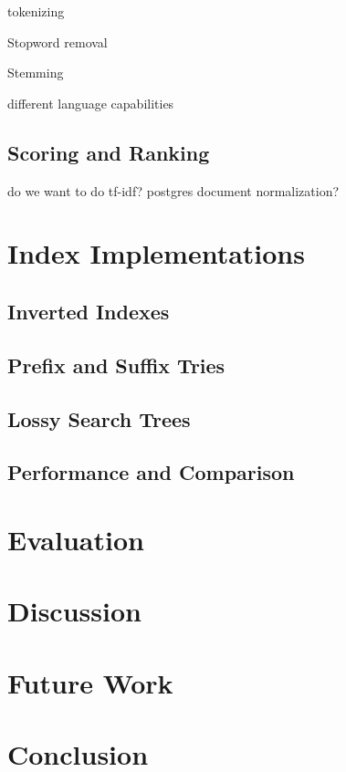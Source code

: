 \documentclass{vldb}
\begin{document}
tokenizing

Stopword removal

Stemming

different language capabilities

\subsection{Scoring and Ranking}

do we want to do tf-idf? postgres document normalization?



\section{Index Implementations}

\subsection{Inverted Indexes}

\subsection{Prefix and Suffix Tries}

\subsection{Lossy Search Trees}

\subsection{Performance and Comparison}

\section{Evaluation}




\section{Discussion}

\section{Future Work}

\section{Conclusion}



 
\end{document}
